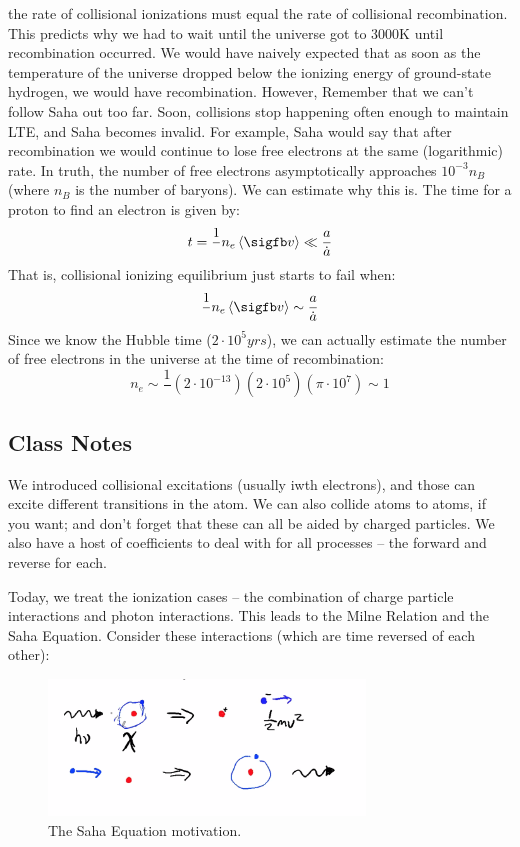 \documentclass{article}
\def\inv#1{\frac1{#1}}
\def\inv#1{{\frac{1}{}#1}}
\def\mean#1{\left\langle {#1}\right\rangle}
\def\e#1{\cdot10^{#1}}
\begin{document}
the rate of collisional ionizations must equal the rate of collisional 
recombination.  This predicts why we had to wait until the
universe got to 3000K until recombination occurred.  We would have naively 
expected
that as soon as the temperature of the universe dropped below the ionizing 
energy of ground-state hydrogen, we would have recombination.  However, 
Remember that we can't follow Saha out too far.  Soon, collisions stop happening
often enough to maintain LTE, and Saha becomes invalid.  For example, Saha
would say that after recombination we would continue to lose free electrons
at the same (logarithmic) rate.  In truth, the number of free electrons
asymptotically approaches $10^{-3}n_B$ (where $n_B$ is the number of baryons).
We can estimate why this is.  The time for a proton to find an electron is
given by:
$$t=\inv{n_e\mean{\sigfb v}}\ll\frac{a}{ \dot a}$$
That is, collisional ionizing equilibrium just starts to fail when:
$$\inv{n_e\mean{\sigfb v}}\sim\frac{a}{ \dot a}$$
Since we know the Hubble time ($2\e5 yrs$), we can actually estimate
the number of free electrons in the universe at the time of recombination:
$$n_e\sim\inv{(2\e{-13})(2\e5)(\pi\e7)}\sim1$$



\subsection{Class Notes}

We introduced collisional excitations (usually iwth electrons), and those can excite different transitions in the atom. We can also collide atoms to atoms, if you want; and don't forget that these can all be aided by charged particles. We also have a host of coefficients to deal with for all processes -- the forward and reverse for each.

Today, we treat the ionization cases -- the combination of charge particle interactions and photon interactions. This leads to the Milne Relation and the Saha Equation. Consider these interactions (which are time reversed of each other): 

\begin{figure}
    \centering
    \includegraphics[width=0.75\textwidth]{figures/Screen Shot 2020-10-20 at 11.16.37 AM.png}
    \caption{The Saha Equation motivation.}
    \label{fig:saha_mot}
\end{figure}
\end{document}
